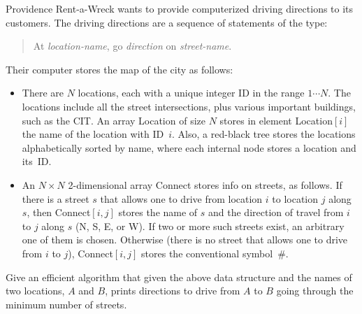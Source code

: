Providence Rent-a-Wreck wants to provide computerized driving
directions to its customers.  The driving directions are a
sequence of statements of the type:

\begin{quote}
At {\em location-name}, go {\em direction} on {\em street-name}.
\end{quote}

Their computer stores the map of the city as follows:

\begin{itemize}

\item  There are $N$ locations, each with a unique integer ID in the
range $1 \cdots  N$.  The locations include all the street
intersections, plus various important buildings, such as the CIT.  An
array {\sf Location} of size $N$ stores in element {\sf Location}$[i]$
the name of the location with ID~$i$.  Also, a red-black tree stores
the locations alphabetically sorted by name, where each internal node
stores a location and its~ID.

\item  An $N \times  N$ 2-dimensional array {\sf Connect} stores info on
streets, as follows.  If there is a street $s$ that allows one to drive
from location $i$ to location $j$ along $s$, then {\sf Connect}$[i,j]$
stores the name of $s$ and the direction of travel from $i$ to $j$
along $s$ (N, S, E, or W).  If two or more such streets exist, an
arbitrary one of them is chosen. Otherwise (there is no street that
allows one to drive from $i$ to $j$), {\sf Connect}$[i,j]$ stores the
conventional symbol~\#.

\end{itemize}

Give an efficient algorithm that given the above data structure and the
names of two locations, $A$ and $B$, prints directions to drive from
$A$ to $B$ going through the minimum number of streets.

